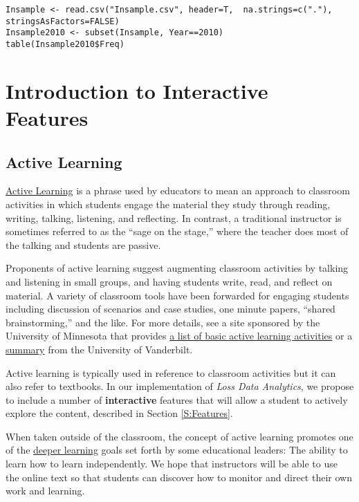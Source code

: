 \documentclass[
]{book}
\begin{document}
\hypertarget{display.T:Frequency.2Intro}{}
\begin{verbatim}
Insample <- read.csv("Insample.csv", header=T,  na.strings=c("."), stringsAsFactors=FALSE)
Insample2010 <- subset(Insample, Year==2010)
table(Insample2010$Freq)
\end{verbatim}

\hypertarget{introduction-to-interactive-features}{%
\chapter{Introduction to Interactive Features}\label{introduction-to-interactive-features}}

\hypertarget{active-learning}{%
\section{Active Learning}\label{active-learning}}

\href{https://cei.umn.edu/support-services/tutorials/what-active-learning}{Active Learning} is a phrase used by educators to mean an approach to classroom activities in which students engage the material they study through reading, writing, talking, listening, and reflecting. In contrast, a traditional instructor is sometimes referred to as the ``sage on the stage,'' where the teacher does most of the talking and students are passive.

Proponents of active learning suggest augmenting classroom activities by talking and listening in small groups, and having students write, read, and reflect on material. A variety of classroom tools have been forwarded for engaging students including discussion of scenarios and case studies, one minute papers, ``shared brainstorming,'' and the like. For more details, see a site sponsored by the University of Minnesota that provides \href{https://cei.umn.edu/active-learning}{a list of basic active learning activities} or a \href{https://cft.vanderbilt.edu/active-learning/}{summary} from the University of Vanderbilt.

Active learning is typically used in reference to classroom activities but it can also refer to textbooks. In our implementation of \emph{Loss Data Analytics}, we propose to include a number of \textbf{interactive} features that will allow a student to actively explore the content, described in Section \ref{S:Features}.

When taken outside of the classroom, the concept of active learning promotes one of the \href{http://www.hewlett.org/programs/education/deeper-learning}{deeper learning} goals set forth by some educational leaders: The ability to learn how to learn independently. We hope that instructors will be able to use the online text so that students can discover how to monitor and direct their own work and learning.
\end{document}
